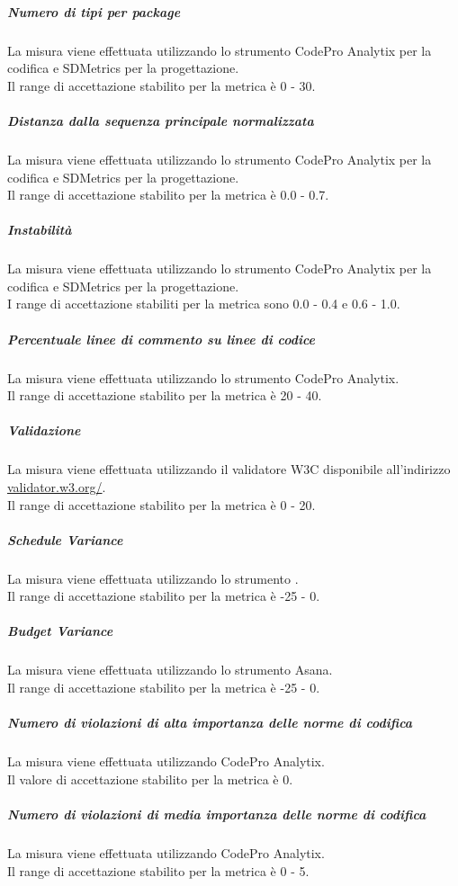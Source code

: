 			\subparagraph{Numero di tipi per package}
			La misura viene effettuata utilizzando lo strumento CodePro Analytix per la codifica e SDMetrics per la progettazione.
			\\Il range di accettazione stabilito per la metrica è 0 - 30.
			
			\subparagraph{Distanza dalla sequenza principale normalizzata}
			La misura viene effettuata utilizzando lo strumento CodePro Analytix per la codifica e SDMetrics per la progettazione.
			\\Il range di accettazione stabilito per la metrica è 0.0 - 0.7.
			
			\subparagraph{Instabilità}
			La misura viene effettuata utilizzando lo strumento CodePro Analytix per la codifica e SDMetrics per la progettazione.
			\\I range di accettazione stabiliti per la metrica sono 0.0 - 0.4 e 0.6 - 1.0.
			
			\subparagraph{Percentuale linee di commento su linee di codice}
			La misura viene effettuata utilizzando lo strumento CodePro Analytix.
			\\Il range di accettazione stabilito per la metrica è 20 - 40.
			
			\subparagraph{Validazione }
			La misura viene effettuata utilizzando il validatore W3C disponibile all'indirizzo \url{validator.w3.org/}.
			\\Il range di accettazione stabilito per la metrica è 0 - 20.
			
			\subparagraph{Schedule Variance}
			La misura viene effettuata utilizzando lo strumento .
			\\Il range di accettazione stabilito per la metrica è -25 - 0.
			
			\subparagraph{Budget Variance}
			La misura viene effettuata utilizzando lo strumento Asana.
			\\Il range di accettazione stabilito per la metrica è -25 - 0.
			
			\subparagraph{Numero di violazioni di alta importanza delle norme di codifica}
			La misura viene effettuata utilizzando CodePro Analytix.
			\\Il valore di accettazione stabilito per la metrica è 0.
			
			\subparagraph{Numero di violazioni di media importanza delle norme di codifica}
			La misura viene effettuata utilizzando CodePro Analytix.
			\\Il range di accettazione stabilito per la metrica è 0 - 5.
			
